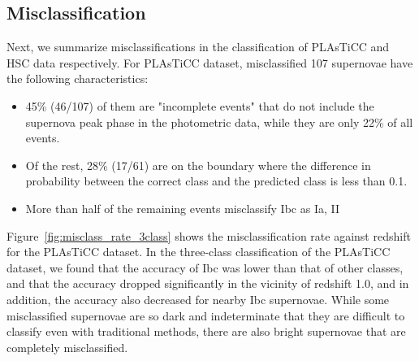\documentclass[useamsfonts]{pasj01}
\begin{document}
\subsection{Misclassification}
\label{sec:misclass}
%
Next, we summarize misclassifications in the classification of PLAsTiCC and HSC data respectively.
For PLAsTiCC dataset, misclassified 107 supernovae have the following characteristics:
\begin{itemize}
\item 45\% (46/107) of them are "incomplete events" that do not include the supernova peak phase in the photometric data, while they are only 22\% of all events.
\item Of the rest, 28\% (17/61) are on the boundary where the difference in probability between the correct class and the predicted class is less than 0.1.
\item More than half of the remaining events misclassify Ibc as Ia, II
\end{itemize}
Figure\ \ref{fig:misclass_rate_3class} shows the misclassification rate against redshift for the PLAsTiCC dataset.
In the three-class classification of the PLAsTiCC dataset, we found that the accuracy of Ibc was lower than that of other classes, and that the accuracy dropped significantly in the vicinity of redshift 1.0, and in addition, the accuracy also decreased for nearby Ibc supernovae.
While some misclassified supernovae are so dark and indeterminate that they are difficult to classify even with traditional methods, there are also bright supernovae that are completely misclassified.
\end{document}
